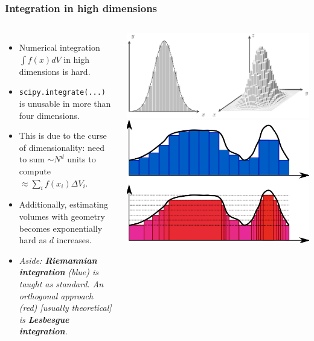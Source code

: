 \documentclass[aspectratio=169]{beamer}
\begin{document}
\begin{frame}
    \frametitle{Integration in high dimensions}
    \begin{columns}
        \begin{itemize}
            \item Numerical integration $\int f(x) dV$ in high dimensions is hard.
            \item \texttt{scipy.integrate(...)} is unusable in more than four dimensions.
            \item This is due to the curse of dimensionality: need to sum $\sim N^d$ units to compute $\approx \sum_i f(x_i) \Delta V_i$.
            \item Additionally, estimating volumes with geometry becomes exponentially hard as $d$ increases.
            \item \textit{Aside: \textbf{Riemannian integration} (blue) is taught as standard. An orthogonal approach (red) [usually theoretical] is \textbf{Lesbesgue integration}.}
        \end{itemize}
        \includegraphics[width=\textwidth]{figures/integration}
        \includegraphics[width=\textwidth]{figures/2560px-Riemannvslebesgue.svg.png}
    \end{columns}
\end{frame}
\end{document}
